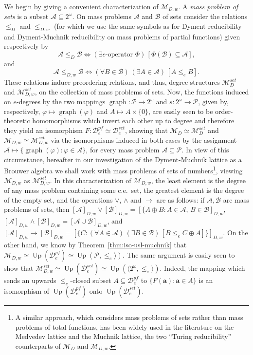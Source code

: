 \documentclass[11pt]{amsart}
\renewcommand{\phi}{\varphi}
\DeclareMathOperator{\up}{Up}
\DeclareMathOperator{\graph}{graph}
\newcommand{\MP}[1]{\ensuremath{\mathcal{#1}}}
\newcommand{\QA}[1]{(\forall{#1})\,}
\newcommand{\QE}[1]{(\exists{#1})\,}
\begin{document}
We begin by giving a convenient characterization of $\mathscr{M}_{D,w}$. A 
\emph{mass problem of sets} is a subset $\MP{A}\subseteq 2^\omega$. On mass 
problems $\mathcal{A}$ and $\mathcal{B}$ of sets consider the relations 
$\leq_{D}$ and $\leq_{D,w}$ (for which we use the same symbols as for 
Dyment reducibility and Dyment-Muchnik reducibility on mass problems of 
partial functions) given respectively by 
\[
\mathcal{A} \leq_{D} \mathcal{B} \Leftrightarrow \QE{ \textrm{$e$-operator $\Phi$}}
[\Phi(\mathcal{B}) \subseteq \mathcal{A}],
\]
and
\[
\mathcal{A} \leq_{D,w} \mathcal{B} \Leftrightarrow
\QA{B\in \mathcal{B}}\QE{A\in 
\mathcal{A}}[A \leq_e B].
\]
These relations induce preordering relations, and thus, degree structures 
$\mathscr{M}_{D}^{set}$ and $\mathscr{M}_{D,w}^{set}$, on the collection of 
mass problems of sets. Now, the functions induced on $e$-degrees by the two 
mappings $\graph: \mathcal{P} \longrightarrow 2^\omega$ and $s: 2^\omega 
\longrightarrow  \mathcal{P}$, given by, respectively, $\phi \mapsto 
\graph(\phi)$ and $A \mapsto A\times\{0\}$, are easily seen to be 
order-theoretic homomorphisms which invert each other up to degree and 
therefore they yield an isomorphism $F: \mathscr{D}^{pf}_e \simeq 
\mathscr{D}_e^{set}$, showing that $\mathscr{M}_{D} \simeq 
\mathscr{M}_{D}^{set}$ and $\mathscr{M}_{D,w} \simeq \mathscr{M}_{D,w}^{set}$ 
via the isomorphisms induced in both cases by the assignment $\mathcal{A} 
\mapsto \{ \graph(\phi): \phi \in \mathcal{A}\}$, for every mass problem 
$\mathcal{A} \subseteq \mathcal{P}$. In view of this circumstance, hereafter 
in our investigation of the Dyment-Muchnik lattice as a Brouwer algebra we 
shall work with mass problems of sets of numbers\footnote{A similar approach, 
which considers mass problems of sets rather than mass problems of total 
functions, has been widely used in the literature on the Medvedev lattice and 
the Muchnik lattice, the two ``Turing reducibility'' counterparts of 
$\mathscr{M}_D$ and $\mathscr{M}_{D,w}$.}, viewing $\mathscr{M}_{D,w}$ as 
$\mathscr{M}_{D,w}^{set}$. In this characterization of $\mathscr{M}_{D,w}$, 
the least element is the degree of any mass problem containing some c.e.\ 
set, the greatest element is the degree of the empty set, and the operations 
$\lor$, $\wedge$ and $\rightarrow$ are as follows: if $\mathcal{A}, 
\mathcal{B}$ are mass problems of sets, then $[\mathcal{A}]_{D,w}\lor 
[\mathcal{B}]_{D,w}= [\{A\oplus B: A \in \mathcal{A}, \, B \in 
\mathcal{B}]_{D,w}$, $[\mathcal{A}]_{D,w}\wedge [\mathcal{B}]_{D,w}= [ 
\mathcal{A} \cup \mathcal{B}]_{D,w}$, and $[\mathcal{A}]_{D,w}\rightarrow 
[\mathcal{B}]_{D,w}=[\{C: \QA{A \in \mathcal{A}}\QE{B\in \mathcal{B}}[B 
\leq_e C \oplus A]\}]_{D,w}$. On the other hand, we know by 
Theorem~\ref{thm:iso-usl-muchnik} that $\mathscr{M}_{D,w} \simeq 
\up(\mathscr{D}_e^{pf}) \simeq \up(\mathcal{P}, \leq_e\rangle)$. The same 
argument is easily seen to show that $\mathscr{M}_{D,w}^{set} \simeq 
\up(\mathscr{D}_e^{set}) \simeq \up(\langle 2^\omega, \leq_e \rangle)$. 
Indeed, the mapping which sends an upwards $\leq_e$-closed subset $A 
\subseteq \mathscr{D}^{pf}_e$ to $\{F(\mathbf{a}): \mathbf{a}\in A\}$ is an 
isomorphism of $\up(\mathscr{D}_e^{pf})$ onto $\up(\mathscr{D}_e^{set})$.  
\end{document}
